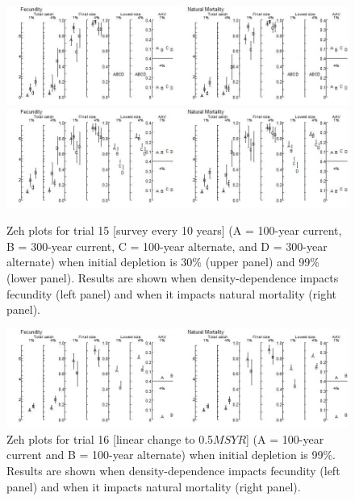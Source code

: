 \documentclass{article}\usepackage[]{graphicx}\usepackage[]{color}
\providecommand\phantomsection{}
\begin{document}
\begin{landscape}
\begin{figure}[H]
\centering
\includegraphics[]{SC66aRMP10_Part2_T14B-R.jpeg}
\includegraphics[]{SC66aRMP10_Part2_T14B-D.jpeg}
\caption{
Zeh plots for trial 15
[survey every 10 years]
(A = 100-year current, B = 300-year current, C = 100-year alternate, and D = 300-year alternate)
when initial depletion is 30\% (upper panel) and 99\% (lower panel).
Results are shown when density-dependence impacts fecundity (left panel) and when it impacts natural mortality (right panel).
}
\end{figure}

\phantomsection
{}
\setcounter{figure}{0}


\begin{figure}[H]
\centering
\includegraphics[]{SC66aRMP10_Part2_T17-D.jpeg}
\caption{
Zeh plots for trial 16
[linear change to 0.5$MSYR$]
(A = 100-year current and B = 100-year alternate)
when initial depletion is 99\%.
Results are shown when density-dependence impacts fecundity (left panel) and when it impacts natural mortality (right panel).
}
\end{figure}


\end{landscape}
\end{document}
